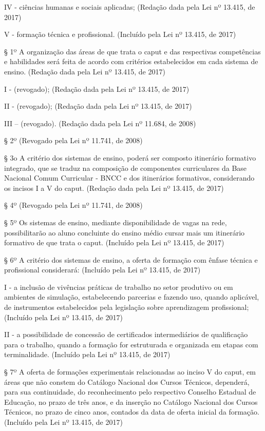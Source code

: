 \documentclass[
]{book}
\begin{document}
IV - ciências humanas e sociais aplicadas; (Redação dada pela Lei nº 13.415, de 2017)

V - formação técnica e profissional. (Incluído pela Lei nº 13.415, de 2017)

§ 1º A organização das áreas de que trata o caput e das respectivas competências e habilidades será feita de acordo com critérios estabelecidos em cada sistema de ensino. (Redação dada pela Lei nº 13.415, de 2017)

I - (revogado); (Redação dada pela Lei nº 13.415, de 2017)

II - (revogado); (Redação dada pela Lei nº 13.415, de 2017)

III -- (revogado). (Redação dada pela Lei nº 11.684, de 2008)

§ 2º (Revogado pela Lei nº 11.741, de 2008)

§ 3o A critério dos sistemas de ensino, poderá ser composto itinerário formativo integrado, que se traduz na composição de componentes curriculares da Base Nacional Comum Curricular - BNCC e dos itinerários formativos, considerando os incisos I a V do caput. (Redação dada pela Lei nº 13.415, de 2017)

§ 4º (Revogado pela Lei nº 11.741, de 2008)

§ 5º Os sistemas de ensino, mediante disponibilidade de vagas na rede, possibilitarão ao aluno concluinte do ensino médio cursar mais um itinerário formativo de que trata o caput. (Incluído pela Lei nº 13.415, de 2017)

§ 6º A critério dos sistemas de ensino, a oferta de formação com ênfase técnica e profissional considerará: (Incluído pela Lei nº 13.415, de 2017)

I - a inclusão de vivências práticas de trabalho no setor produtivo ou em ambientes de simulação, estabelecendo parcerias e fazendo uso, quando aplicável, de instrumentos estabelecidos pela legislação sobre aprendizagem profissional; (Incluído pela Lei nº 13.415, de 2017)

II - a possibilidade de concessão de certificados intermediários de qualificação para o trabalho, quando a formação for estruturada e organizada em etapas com terminalidade. (Incluído pela Lei nº 13.415, de 2017)

§ 7º A oferta de formações experimentais relacionadas ao inciso V do caput, em áreas que não constem do Catálogo Nacional dos Cursos Técnicos, dependerá, para sua continuidade, do reconhecimento pelo respectivo Conselho Estadual de Educação, no prazo de três anos, e da inserção no Catálogo Nacional dos Cursos Técnicos, no prazo de cinco anos, contados da data de oferta inicial da formação. (Incluído pela Lei nº 13.415, de 2017)
\end{document}
